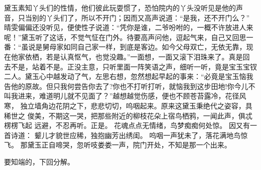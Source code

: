 黛玉素知丫头们的性情，他们彼此玩耍惯了，恐怕院内的丫头没听见是他的声
音，只当别的丫头们了，所以不开门；因而又高声说道：“是我，还不开门么？”
晴雯偏偏还没听见，便使性子说道：“凭你是谁，二爷吩咐的，一概不许放进人来
呢！”黛玉听了这话，不觉气怔在门外。待要高声问他，逗起气来，自己又回思一
番：“虽说是舅母家如同自己家一样，到底是客边。如今父母双亡，无依无靠，现
在他家依栖，若是认真怄气，也觉没趣。”一面想，一面又滚下泪珠来了。真是回
去不是，站着不是。正没主意，只听里面一阵笑语之声，细听一听，竟是宝玉宝钗
二人。黛玉心中越发动了气，左思右想，忽然想起早起的事来：“必竟是宝玉恼我
告他的原故。但只我何尝告你去了?你也不打听打听，就恼我到这步田地!你今儿不
叫我进来，难道明儿就不见面了？”越想越觉伤感，便也不顾苍苔露冷，花径风寒，
独立墙角边花阴之下，悲悲切切，呜咽起来。原来这黛玉秉绝代之姿容，具稀世之
俊美，不期这一哭，把那些附近的柳枝花朵上宿鸟栖鸦，一闻此声，俱忒楞楞飞起
远避，不忍再听。正是。
花魂点点无情绪，鸟梦痴痴何处惊。
因又有一首诗道：
颦儿才貌世应稀，独抱幽芳出绣闺。
呜咽一声犹未了，落花满地鸟惊飞。
那黛玉正自啼哭，忽听吱娄娄一声，院门开处，不知是那一个出来。

要知端的，下回分解。